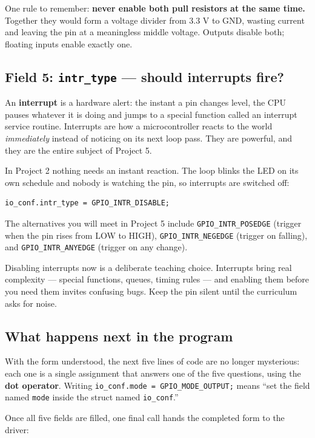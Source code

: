 \documentclass[11pt]{article}
\begin{document}
One rule to remember: \textbf{never enable both pull resistors at the same time.} Together they would form a voltage divider from 3.3 V to GND, wasting current and leaving the pin at a meaningless middle voltage. Outputs disable both; floating inputs enable exactly one.

\subsection{Field 5: \texttt{intr\_type} --- should interrupts fire?}

An \textbf{interrupt} is a hardware alert: the instant a pin changes level, the CPU pauses whatever it is doing and jumps to a special function called an interrupt service routine. Interrupts are how a microcontroller reacts to the world \emph{immediately} instead of noticing on its next loop pass. They are powerful, and they are the entire subject of Project 5.

In Project 2 nothing needs an instant reaction. The loop blinks the LED on its own schedule and nobody is watching the pin, so interrupts are switched off:

\begin{verbatim}
io_conf.intr_type = GPIO_INTR_DISABLE;
\end{verbatim}

The alternatives you will meet in Project 5 include \texttt{GPIO\_INTR\_POSEDGE} (trigger when the pin rises from LOW to HIGH), \texttt{GPIO\_INTR\_NEGEDGE} (trigger on falling), and \texttt{GPIO\_INTR\_ANYEDGE} (trigger on any change).

Disabling interrupts now is a deliberate teaching choice. Interrupts bring real complexity --- special functions, queues, timing rules --- and enabling them before you need them invites confusing bugs. Keep the pin silent until the curriculum asks for noise.

\subsection{What happens next in the program}

With the form understood, the next five lines of code are no longer mysterious: each one is a single assignment that answers one of the five questions, using the \textbf{dot operator}. Writing \texttt{io\_conf.mode = GPIO\_MODE\_OUTPUT;} means ``set the field named \texttt{mode} inside the struct named \texttt{io\_conf}.''

Once all five fields are filled, one final call hands the completed form to the driver:
\end{document}
